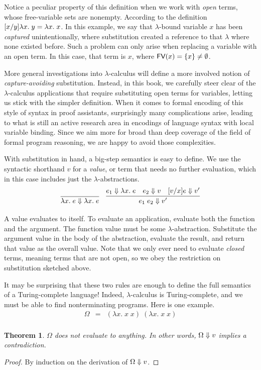 \documentclass{amsbook}
\newtheorem{theorem}{Theorem}[chapter]
\theoremstyle{definition}
\theoremstyle{remark}
\numberwithin{section}{chapter}
\numberwithin{equation}{chapter}
\begin{document}
Notice a peculiar property of this definition when we work with \emph{open} terms, whose free-variable sets are nonempty.
According to the definition $\subst{\lambda x. \; y}{y}{x} = \lambda x. \; x$.
In this example, we say that $\lambda$-bound variable $x$ has been \emph{captured} unintentionally, where substitution created a reference to that $\lambda$ where none existed before.
Such a problem can only arise when replacing a variable with an open term.
In this case, that term is $x$, where $\fv{x} = \{x\} \neq \emptyset$.

More general investigations into $\lambda$-calculus will define a more involved notion of \emph{capture-avoiding} substitution.
Instead, in this book, we carefully steer clear of the $\lambda$-calculus applications that require substituting open terms for variables, letting us stick with the simpler definition.
When it comes to formal encoding of this style of syntax in proof assistants, surprisingly many complications arise, leading to what is still an active research area in encodings of language syntax with local variable binding.
Since we aim more for broad than deep coverage of the field of formal program reasoning, we are happy to avoid those complexities.

With substitution in hand, a big-step semantics is easy to define.
We use the syntactic shorthand $v$ for a \emph{value}, or term that needs no further evaluation, which in this case includes just the $\lambda$-abstractions.
\encoding
$$\infer{\bigstep{\lambda x. \; e}{\lambda x. \; e}}{}
\quad \infer{\bigstep{e_1 \; e_2}{v'}}{
  \bigstep{e_1}{\lambda x. \; e}
  & \bigstep{e_2}{v}
  & \bigstep{\subst{e}{x}{v}}{v'}
}$$

A value evaluates to itself.
To evaluate an application, evaluate both the function and the argument.
The function value must be some $\lambda$-abstraction.
Substitute the argument value in the body of the abstraction, evaluate the result, and return that value as the overall value.
Note that we only ever need to evaluate \emph{closed} terms, meaning terms that are not open, so we obey the restriction on substitution sketched above.

It may be surprising that these two rules are enough to define the full semantics of a Turing-complete language!
Indeed, $\lambda$-calculus is Turing-complete, and we must be able to find nonterminating programs.
Here is one example. \label{Omega}
\begin{eqnarray*}
  \Omega &=& (\lambda x. \; x \; x) \; (\lambda x. \; x \; x) \\
\end{eqnarray*}
\begin{theorem}
  $\Omega$ does not evaluate to anything.  In other words, $\bigstep{\Omega}{v}$ implies a contradiction.
\end{theorem}
\begin{proof}
  By induction on the derivation of $\bigstep{\Omega}{v}$.
\end{proof}
\end{document}
